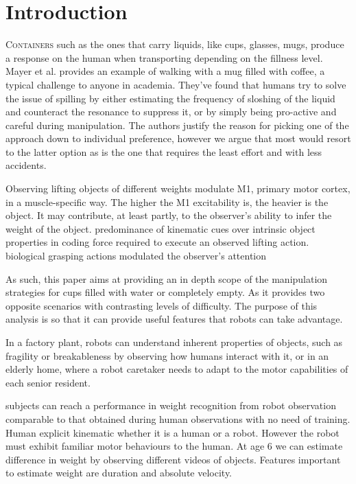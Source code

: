 \section{Introduction}

\lettrine{C}{ontainers} such as the ones that carry liquids, like cups, glasses, mugs, produce a response on the human when transporting depending on the fillness level. Mayer et al. \cite{mayer_walking_2012} provides an example of walking with a mug filled with coffee, a typical challenge to anyone in academia. They've found that humans try to solve the issue of spilling by either estimating the frequency of sloshing of the liquid and counteract the resonance to suppress it, or by simply being pro-active and careful during manipulation. The authors justify the reason for picking one of the approach down to individual preference, however we argue that most would resort to the latter option as is the one that requires the least effort and with less accidents. 

\cite{alaerts_force_2010} Observing lifting objects of different weights modulate M1, primary motor cortex, in a muscle-specific way.  The higher the M1 excitability is, the heavier is the object. It may contribute, at least partly, to the observer's ability to infer the weight of the object. 
\cite{senot_effect_2011}
predominance of kinematic cues over intrinsic object properties in coding force required to execute an observed lifting action. 
\cite{lindemann_grasping_2011} biological grasping actions modulated the observer's attention

As such, this paper aims at providing an in depth scope of the manipulation strategies for cups filled with water or completely empty. As it provides two opposite scenarios with contrasting levels of difficulty. The purpose of this analysis is so that it can provide useful features that robots can take advantage. 

In a factory plant, robots can understand inherent properties of objects, such as fragility or breakableness by observing how humans interact with it, or in an elderly home, where a robot caretaker needs to adapt to the motor capabilities of each senior resident. 


\cite{hamilton_kinematic_2007} \cite{sciutti_understanding_2014} subjects can reach a performance in weight recognition from robot observation comparable to that obtained during human observations with no need of training. Human explicit kinematic whether it is a human or a robot. However the robot must exhibit familiar motor behaviours to the human. 
\cite{sciutti_development_2019} At age 6 we can estimate difference in weight by observing different videos of objects. Features important to estimate weight are duration and absolute velocity. 

